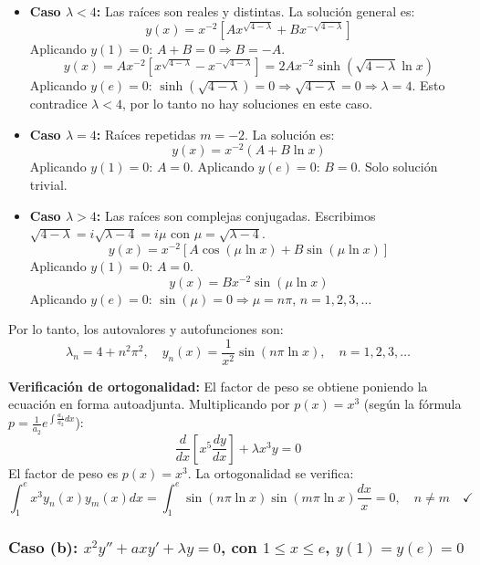 \documentclass[a4paper]{article}
\begin{document}
\begin{itemize}
    \item \textbf{Caso $\lambda < 4$:} Las raíces son reales y distintas. La solución general es:
    $$
    y(x) = x^{-2}\left[A x^{\sqrt{4-\lambda}} + B x^{-\sqrt{4-\lambda}}\right]
    $$
    Aplicando $y(1) = 0$: $A + B = 0 \Rightarrow B = -A$.
    $$
    y(x) = A x^{-2}\left[x^{\sqrt{4-\lambda}} - x^{-\sqrt{4-\lambda}}\right] = 2A x^{-2} \sinh\left(\sqrt{4-\lambda} \ln x\right)
    $$
    Aplicando $y(e) = 0$: $\sinh\left(\sqrt{4-\lambda}\right) = 0 \Rightarrow \sqrt{4-\lambda} = 0 \Rightarrow \lambda = 4$.
    Esto contradice $\lambda < 4$, por lo tanto no hay soluciones en este caso.
    
    \item \textbf{Caso $\lambda = 4$:} Raíces repetidas $m = -2$. La solución es:
    $$
    y(x) = x^{-2}(A + B \ln x)
    $$
    Aplicando $y(1) = 0$: $A = 0$.
    Aplicando $y(e) = 0$: $B = 0$. Solo solución trivial.
    
    \item \textbf{Caso $\lambda > 4$:} Las raíces son complejas conjugadas. Escribimos $\sqrt{4-\lambda} = i\sqrt{\lambda-4} = i\mu$ con $\mu = \sqrt{\lambda-4}$.
    $$
    y(x) = x^{-2}\left[A \cos(\mu \ln x) + B \sin(\mu \ln x)\right]
    $$
    Aplicando $y(1) = 0$: $A = 0$.
    $$
    y(x) = B x^{-2} \sin(\mu \ln x)
    $$
    Aplicando $y(e) = 0$: $\sin(\mu) = 0 \Rightarrow \mu = n\pi$, $n = 1, 2, 3, \dots$
\end{itemize}

Por lo tanto, los autovalores y autofunciones son:
$$
\boxed{\lambda_n = 4 + n^2\pi^2, \quad y_n(x) = \frac{1}{x^2} \sin(n\pi \ln x), \quad n = 1, 2, 3, \dots}
$$

\textbf{Verificación de ortogonalidad:} El factor de peso se obtiene poniendo la ecuación en forma autoadjunta. Multiplicando por $p(x) = x^3$ (según la fórmula $p = \frac{1}{a_2}e^{\int \frac{a_1}{a_2}dx}$):
$$
\frac{d}{dx}\left[x^5 \frac{dy}{dx}\right] + \lambda x^3 y = 0
$$
El factor de peso es $p(x) = x^3$. La ortogonalidad se verifica:
$$
\int_1^e x^3 y_n(x) y_m(x) dx = \int_1^e \sin(n\pi \ln x) \sin(m\pi \ln x) \frac{dx}{x} = 0, \quad n \neq m \quad \checkmark
$$

\subsubsection{Caso (b): $x^2y'' + axy' + \lambda y = 0$, con $1 \leq x \leq e$, $y(1) = y(e) = 0$}
\end{document}
